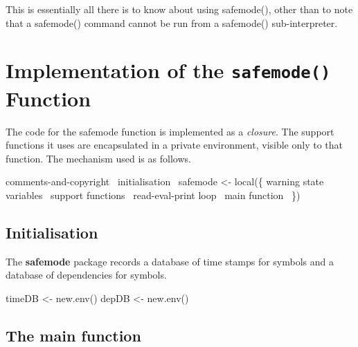 \documentclass[a4paper]{article}%
\newcommand{\pkg}[1]{{\bf #1}}
\begin{document}
This is essentially all there is to know about using {\Tt{}safemode()\nwendquote},
other than to note that a {\Tt{}safemode()\nwendquote} command cannot be run from a
{\Tt{}safemode()\nwendquote} sub-interpreter.

\section{Implementation of the \texttt{safemode()} Function}

The code for the {\Tt{}safemode\nwendquote}
function is implemented as a \emph{closure}.  The
support functions it uses are encapsulated in a private environment,
visible only to that function.  The mechanism used is as follows.

\endmoddef\let\nwnotused=\nwoutput{}\nwstartdeflinemarkup\nwenddeflinemarkup
\LA{}comments-and-copyright~{\nwtagstyle{}}\RA{}
\LA{}initialisation~{\nwtagstyle{}}\RA{}
safemode <- local(\{
    \LA{}warning state variables~{\nwtagstyle{}}\RA{}
    \LA{}support functions~{\nwtagstyle{}}\RA{}
    \LA{}read-eval-print loop~{\nwtagstyle{}}\RA{}
    \LA{}main function~{\nwtagstyle{}}\RA{}
\})
\nwnotused{safemode.R}\nwendcode{}\nwdocspar

\subsection{Initialisation}
\label{sec:init}

The \pkg{safemode} package records a database of time stamps
for symbols and a database of dependencies for symbols.

\nwenddocs{}\endmoddef\let\nwnotused=\nwoutput{}\nwstartdeflinemarkup{}\nwenddeflinemarkup
timeDB <- new.env()
depDB <- new.env()
\nwendcode{}\nwdocspar

\subsection{The main function}
\label{sec:the-main-function}
\end{document}
